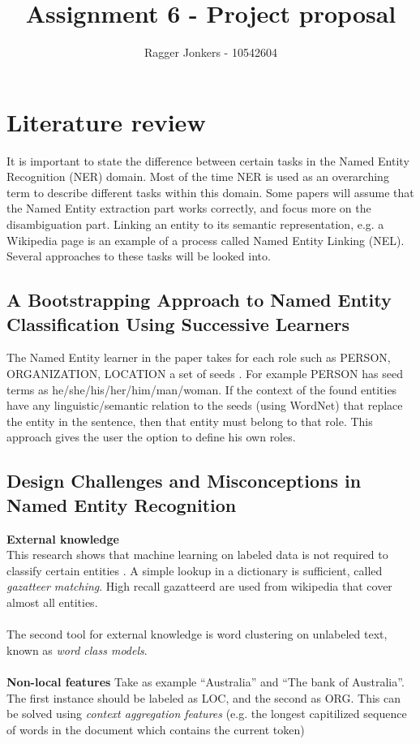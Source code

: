 \documentclass{article}
\title{Assignment 6 - Project proposal}
\author{Ragger Jonkers - 10542604}
\begin{document}
\maketitle

\section{Literature review}
It is important to state the difference between certain tasks in the Named Entity Recognition (NER) domain. Most of the time NER is used as an overarching term to describe different tasks within this domain. Some papers will assume that the Named Entity extraction part works correctly, and focus more on the disambiguation part. Linking an entity to its semantic representation, e.g. a Wikipedia page \cite{hachey2011graph} is an example of a process called Named Entity Linking (NEL). Several approaches to these tasks will be looked into.

\subsection*{A Bootstrapping Approach to Named Entity Classification Using Successive Learners}
The Named Entity learner in the paper takes for each role such as PERSON, ORGANIZATION, LOCATION a set of seeds \cite{niu2003bootstrapping}. For example PERSON has seed terms as he/she/his/her/him/man/woman. If the context of the found entities have any linguistic/semantic relation to the seeds (using WordNet) that replace the entity in the sentence, then that entity must belong to that role. This approach gives the user the option to define his own roles.

\subsection*{Design Challenges and Misconceptions in Named Entity Recognition}
\textbf{External knowledge}\\
This research shows that machine learning on labeled data is not required to classify certain entities \cite{ratinov2009design}. A simple lookup in a dictionary is sufficient, called \textit{gazatteer matching}. High recall gazatteerd are used from wikipedia that cover almost all entities.\\\\
The second tool for external knowledge is word clustering on unlabeled text, known as \textit{word class models}.\\\\
\textbf{Non-local features}
Take as example “Australia” and “The bank of Australia”. The first instance should be labeled
as LOC, and the second as ORG. This can be solved using \textit{context aggregation features} (e.g. the longest capitilized sequence of words in the document which contains the current token)
\end{document}
